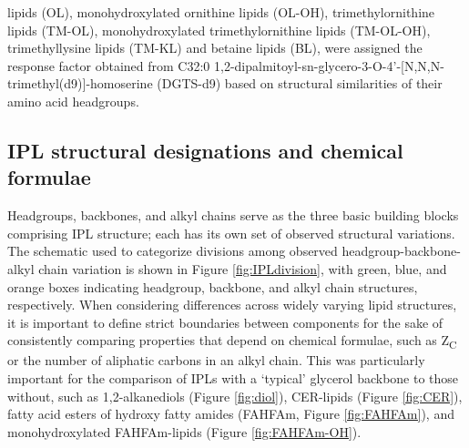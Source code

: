 lipids (OL), monohydroxylated ornithine lipids (OL-OH), trimethylornithine lipids (TM-OL), monohydroxylated trimethylornithine lipids (TM-OL-OH), trimethyllysine lipids (TM-KL) and betaine lipids (BL), were assigned the response factor obtained from C32:0 1,2-dipalmitoyl-sn-glycero-3-O-4'-[N,N,N-trimethyl(d9)]-homoserine (DGTS-d9) based on structural similarities of their amino acid headgroups.




\subsection{IPL structural designations and chemical formulae} Headgroups, backbones, and alkyl chains serve as the three basic building blocks comprising IPL structure; each has its own set of observed structural variations. The schematic used to categorize divisions among observed headgroup-backbone-alkyl chain variation is shown in Figure \ref{fig:IPLdivision}, with green, blue, and orange boxes indicating headgroup, backbone, and alkyl chain structures, respectively. When considering differences across widely varying lipid structures, it is important to define strict boundaries between components for the sake of consistently comparing properties that depend on chemical formulae, such as Z\textsubscript{C} or the number of aliphatic carbons in an alkyl chain. This was particularly important for the comparison of IPLs with a `typical' glycerol backbone to those without, such as 1,2-alkanediols (Figure \ref{fig:diol}), CER-lipids (Figure \ref{fig:CER}), fatty acid esters of hydroxy fatty amides (FAHFAm, Figure \ref{fig:FAHFAm}), and monohydroxylated FAHFAm-lipids (Figure \ref{fig:FAHFAm-OH}).


